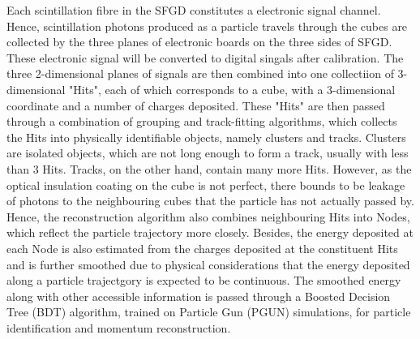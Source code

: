   Each scintillation fibre in the SFGD constitutes a electronic signal channel.
  Hence, scintillation photons produced as a particle travels through the cubes are collected by the three planes of electronic boards on the three sides of SFGD.
  These electronic signal will be converted to digital singals after calibration.
  The three 2-dimensional planes of signals are then combined into one collectiion of 3-dimensional "Hits", each of which corresponds to a cube, with a 3-dimensional coordinate and a number of charges deposited. 
  These "Hits" are then passed through a combination of grouping and track-fitting algorithms, which collects the Hits into physically identifiable objects, namely clusters and tracks. 
  Clusters are isolated objects, which are not long enough to form a track, usually with less than 3 Hits.
  Tracks, on the other hand, contain many more Hits. 
  However, as the optical insulation coating on the cube is not perfect, there bounds to be leakage of photons to the neighbouring cubes that the particle has not actually passed by.
  Hence, the reconstruction algorithm also combines neighbouring Hits into Nodes, which reflect the particle trajectory more closely.
  Besides, the energy deposited at each Node is also estimated from the charges deposited at the constituent Hits and is further smoothed due to physical considerations that the energy deposited along a particle trajectgory is expected to be continuous.
  The smoothed energy along with other accessible information is passed through a Boosted Decision Tree (BDT) algorithm, trained on Particle Gun (PGUN) simulations, for particle identification and momentum reconstruction.
